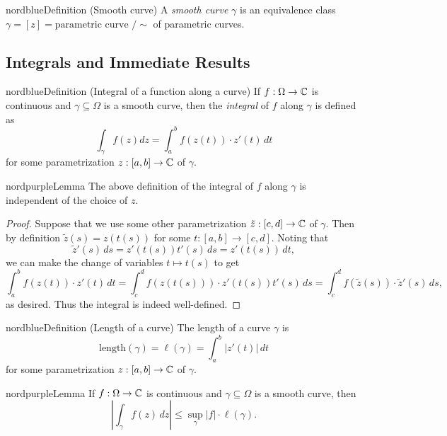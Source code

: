 \begin{mybox}{nordblue}{Definition (Smooth curve)}
  A \textit{smooth curve} $\gamma$ is an equivalence class
  $\gamma = [z] = \text{parametric curve } /\sim$ of
  parametric curves.
\end{mybox}

\subsection{Integrals and Immediate Results}
\begin{mybox}{nordblue}{Definition (Integral of a function along a curve)}
  If $f : \Omega \to \mathbb{C}$ is continuous and
  $\gamma \subseteq \Omega$ is a smooth curve, then the
  \textit{integral} of $f$ along $\gamma$ is defined as
  \[
    \int_\gamma f(z) dz = \int_a^b f(z(t)) \cdot z'(t)\, dt
  \]
  for some parametrization
  $z : [a, b] \to \mathbb{C}$ of $\gamma$.
\end{mybox}

\begin{mybox}{nordpurple}{Lemma}
  The above definition of the integral of $f$
  along $\gamma$ is independent of the choice of
  $z$.
\end{mybox}

\begin{proof}
  Suppose that we use some other parametrization
  $\tilde{z} : [c, d] \to \mathbb{C}$ of $\gamma$. Then
  by definition $\tilde{z}(s) = z(t(s))$ for some
  $t : [a, b] \to [c, d]$. Noting that
  \[
    \tilde{z}'(s) \, ds = z'(t(s)) t'(s) \, ds
    = z'(t(s)) \, dt,
  \]
  we can make the change of variables $t \mapsto t(s)$
  to get
  \[
    \int_a^b f(z(t)) \cdot z'(t) \, dt
    = \int_c^d f(z(t(s))) \cdot z'(t(s)) t'(s)\, ds
    = \int_c^d f(\tilde{z}(s)) \cdot \tilde{z}'(s)\, ds,
  \]
  as desired. Thus the integral is indeed well-defined.
\end{proof}

\begin{mybox}{nordblue}{Definition (Length of a curve)}
  The length of a curve $\gamma$ is
  \[
    \text{length}(\gamma) = \ell(\gamma)
    = \int_a^b |z'(t)|\, dt
  \]
  for some parametrization
  $z : [a, b] \to \mathbb{C}$ of $\gamma$.
\end{mybox}

\begin{mybox}{nordpurple}{Lemma}
  If $f : \Omega \to \mathbb{C}$ is continuous and
  $\gamma \subseteq \Omega$ is a smooth curve, then
  \[
    \left|\int_{\gamma} f(z) \, dz\right|
    \le \sup_{\gamma} |f| \cdot \ell(\gamma).
  \]
\end{mybox}

